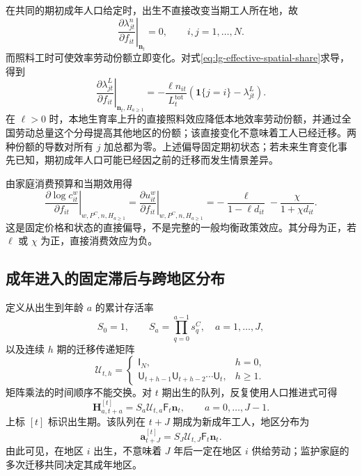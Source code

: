 \documentclass[UTF8,a4paper,zihao=-4,fontset=windows]{ctexart}
\numberwithin{equation}{section}
\newcommand{\pc}{P^{C}}
\newcommand{\Id}{\mathsf{I}}
\begin{document}
在共同的期初成年人口给定时，出生不直接改变当期工人所在地，故
\begin{equation}
 \left.\frac{\partial\lambda^n_{jt}}{\partial f_{it}}\right|_{\bm n_t}=0,
 \qquad i,j=1,\ldots,N.
 \label{eq:lg-instant-headcount-share}
\end{equation}
而照料工时可使效率劳动份额立即变化。对式\eqref{eq:lg-effective-spatial-share}求导，得到
\begin{equation}
 \left.\frac{\partial\lambda^L_{jt}}{\partial f_{it}}\right|_{\bm n_t,H_{a\geq1}}
 =-\frac{\ell n_{it}}{L_t^{\mathrm{tot}}}
 \left(\mathbf1\{j=i\}-\lambda^L_{jt}\right).
 \label{eq:lg-instant-effective-share}
\end{equation}
在 $\ell>0$ 时，本地生育率上升的直接照料效应降低本地效率劳动份额，并通过全国劳动总量这个分母提高其他地区的份额；该直接变化不意味着工人已经迁移。两种份额的导数对所有 $j$ 加总都为零。上述偏导固定期初状态；若未来生育变化事先已知，期初成年人口可能已经因之前的迁移而发生情景差异。

由家庭消费预算和当期效用得
\begin{equation}
 \left.\frac{\partial\log c^w_{it}}{\partial f_{it}}\right|_{w,\pc,n,H_{a\geq1}}
 =\left.\frac{\partial u^w_{it}}{\partial f_{it}}\right|_{w,\pc,n,H_{a\geq1}}
 =-\frac{\ell}{1-\ell d_{it}}-\frac{\chi}{1+\chi d_{it}}.
 \label{eq:lg-contemporaneous-utility}
\end{equation}
这是固定价格和状态的直接偏导，不是完整的一般均衡政策效应。其分母为正，若 $\ell$ 或 $\chi$ 为正，直接消费效应为负。

\subsection{成年进入的固定滞后与跨地区分布}
定义从出生到年龄 $a$ 的累计存活率
\begin{equation}
 S_0=1,\qquad S_a=\prod_{q=0}^{a-1}s^C_q,\quad a=1,\ldots,J,
\end{equation}
以及连续 $h$ 期的迁移传递矩阵
\begin{equation}
 \mathcal U_{t,h}=\begin{cases}
 \Id_N,&h=0,\\
 \mathsf U_{t+h-1}\mathsf U_{t+h-2}\cdots\mathsf U_t,&h\geq1.
 \end{cases}
 \label{eq:lg-migration-product}
\end{equation}
矩阵乘法的时间顺序不能交换。对 $t$ 期出生的队列，反复使用人口推进式可得
\begin{equation}
 \bm H_{a,t+a}^{[t]}=S_a\mathcal U_{t,a}\mathsf F_t\bm n_t,
 \qquad a=0,\ldots,J-1.
 \label{eq:lg-born-cohort}
\end{equation}
上标 $[t]$ 标识出生期。该队列在 $t+J$ 期成为新成年工人，地区分布为
\begin{equation}
 \bm a_{t+J}^{[t]}=S_J\mathcal U_{t,J}\mathsf F_t\bm n_t.
 \label{eq:lg-maturing-cohort}
\end{equation}
由此可见，在地区 $i$ 出生，不意味着 $J$ 年后一定在地区 $i$ 供给劳动；监护家庭的多次迁移共同决定其成年地区。
\end{document}
